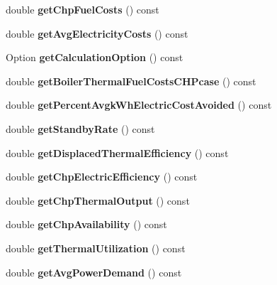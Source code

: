 \begin{DoxyCompactItemize}
double {\bfseries get\+Chp\+Fuel\+Costs} () const
\item 
\mbox{\label{class_c_h_p_a2bc5ac0eb3d7ce42f77f26b3973f6c9f}} 
double {\bfseries get\+Avg\+Electricity\+Costs} () const
\item 
\mbox{\label{class_c_h_p_a858f0201818f637331e0d06d3171bee7}} 
Option {\bfseries get\+Calculation\+Option} () const
\item 
\mbox{\label{class_c_h_p_ace1d96aacf328bd62f01e0eceaae19f6}} 
double {\bfseries get\+Boiler\+Thermal\+Fuel\+Costs\+C\+H\+Pcase} () const
\item 
\mbox{\label{class_c_h_p_ad79607b304d1e50a9421de043b7a9e7b}} 
double {\bfseries get\+Percent\+Avgk\+Wh\+Electric\+Cost\+Avoided} () const
\item 
\mbox{\label{class_c_h_p_a195f0ffe163404077b56a5e5db8eb59c}} 
double {\bfseries get\+Standby\+Rate} () const
\item 
\mbox{\label{class_c_h_p_a66b1b0e6a0d7f3181b3c1dfb590ab523}} 
double {\bfseries get\+Displaced\+Thermal\+Efficiency} () const
\item 
\mbox{\label{class_c_h_p_a1d38e08a7815211361d334263832cad6}} 
double {\bfseries get\+Chp\+Electric\+Efficiency} () const
\item 
\mbox{\label{class_c_h_p_a13e271f59d6315088416123c6e794e09}} 
double {\bfseries get\+Chp\+Thermal\+Output} () const
\item 
\mbox{\label{class_c_h_p_abd1ea13cd48f5af48799891a52634340}} 
double {\bfseries get\+Chp\+Availability} () const
\item 
\mbox{\label{class_c_h_p_aa27fd9e66e208e6b3f28fdfe182d6c32}} 
double {\bfseries get\+Thermal\+Utilization} () const
\item 
\mbox{\label{class_c_h_p_a79f9a97a010669c5ffed9339c54a36c6}} 
double {\bfseries get\+Avg\+Power\+Demand} () const
\item 
\mbox{\label{class_c_h_p_a5f8975488324e4aa3517c9e01334f4bf}} 

\end{DoxyCompactItemize}
